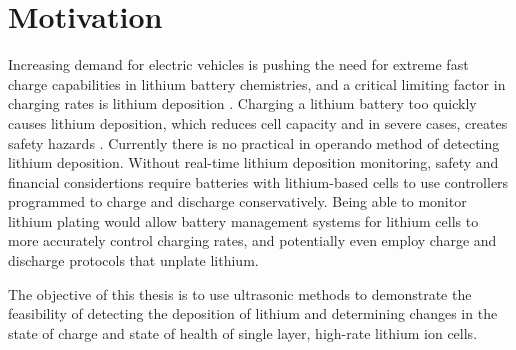 \section{Motivation}
Increasing demand for electric vehicles is pushing the need for extreme fast charge capabilities in lithium battery chemistries, and a critical limiting factor in charging rates is lithium deposition \cite{XFC}. Charging a lithium battery too quickly causes lithium deposition, which reduces cell capacity and in severe cases, creates safety hazards \cite{XFC}. Currently there is no practical in operando method of detecting lithium deposition. Without real-time lithium deposition monitoring, safety and financial considertions require batteries with lithium-based cells to use controllers programmed to charge and discharge conservatively. Being able to monitor lithium plating would allow battery management systems for lithium cells to more accurately control charging rates, and potentially even employ charge and discharge protocols that unplate lithium.

The objective of this thesis is to use ultrasonic methods to demonstrate the feasibility of detecting the deposition of lithium and determining changes in the state of charge and state of health of single layer, high-rate lithium ion cells.